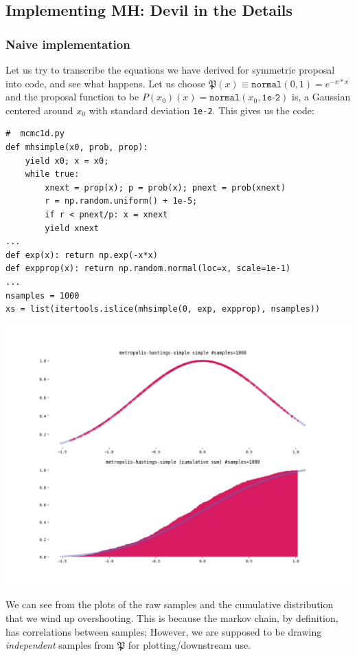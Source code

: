 \documentclass[titlepage]{article}
\renewcommand{\P}{\mathfrak{P}}
\begin{document}
\subsection{Implementing MH: Devil in the Details}

\subsubsection{Naive implementation}

Let us try to transcribe the equations we have derived for symmetric proposal
into code, and see what happens. Let us choose $\P(x) \equiv \texttt{normal}(0, 1) = e^{-x*x}$
and the proposal function to be $P(x_0)(x) = \texttt{normal}(x_0, \texttt{1e-2})$
is, a Gaussian centered around $x_0$ with standard deviation \texttt{1e-2}.
This gives us the code:

{\footnotesize
\begin{verbatim}
#  mcmc1d.py
def mhsimple(x0, prob, prop):
    yield x0; x = x0;
    while true:
        xnext = prop(x); p = prob(x); pnext = prob(xnext)
        r = np.random.uniform() + 1e-5;
        if r < pnext/p: x = xnext
        yield xnext
...
def exp(x): return np.exp(-x*x)
def expprop(x): return np.random.normal(loc=x, scale=1e-1)
...
nsamples = 1000
xs = list(itertools.islice(mhsimple(0, exp, expprop), nsamples))
\end{verbatim}
}

\includegraphics[width=\textwidth]{mcmc-mh-simple-1d-exp.png}

We can see from the plots of the raw samples and the cumulative distribution
that we wind up overshooting. This is because the markov chain, by definition,
has correlations between samples; However, we are supposed to be drawing
\emph{independent} samples from $\P$ for plotting/downstream use.
\end{document}
